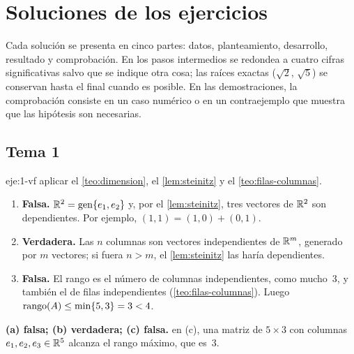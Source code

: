 \chapter{Soluciones de los ejercicios}
\label{ap:soluciones}

Cada solución se presenta en cinco partes: datos, planteamiento, desarrollo, resultado y comprobación. En los pasos intermedios se redondea a cuatro cifras significativas salvo que se indique otra cosa; las raíces exactas ($\sqrt{2}$, $\sqrt{5}$) se conservan hasta el final cuando es posible. En las demostraciones, la comprobación consiste en un caso numérico o en un contraejemplo que muestra que las hipótesis son necesarias.

\section{Tema 1}

\begin{solucion}{eje:1-vf}
\planteamiento aplicar el \cref{teo:dimension}, el \cref{lem:steinitz} y el \cref{teo:filas-columnas}.
\pasos
\begin{enumerate}[label=(\alph*)]
  \item \textbf{Falsa.} $\mathbb{R}^{2}=\operatorname{gen}\{e_1,e_2\}$ y, por el \cref{lem:steinitz}, tres vectores de $\mathbb{R}^{2}$ son dependientes. Por ejemplo, $(1,1)=(1,0)+(0,1)$.
  \item \textbf{Verdadera.} Las $n$ columnas son vectores independientes de $\mathbb{R}^{m}$, generado por $m$ vectores; si fuera $n>m$, el \cref{lem:steinitz} las haría dependientes.
  \item \textbf{Falsa.} El rango es el número de columnas independientes, como mucho~3, y también el de filas independientes (\cref{teo:filas-columnas}). Luego $\operatorname{rango}(A)\le\min\{5,3\}=3<4$.
\end{enumerate}
\resultado \textbf{(a) falsa; (b) verdadera; (c) falsa.}
\comprobacion en (c), una matriz de $5\times 3$ con columnas $e_1,e_2,e_3\in\mathbb{R}^{5}$ alcanza el rango máximo, que es~3.
\end{solucion}

